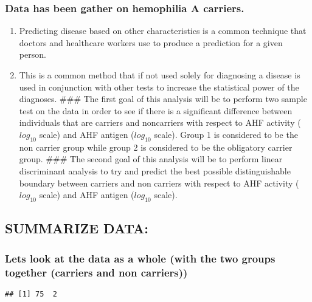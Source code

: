 \documentclass[]{article}
\providecommand{\tightlist}{%
  \setlength{\itemsep}{0pt}\setlength{\parskip}{0pt}}
\begin{document}
\hypertarget{data-has-been-gather-on-hemophilia-a-carriers.}{%
\subsubsection{Data has been gather on hemophilia A
carriers.}\label{data-has-been-gather-on-hemophilia-a-carriers.}}

\begin{enumerate}
\def\labelenumi{\arabic{enumi})}
\tightlist
\item
  Predicting disease based on other characteristics is a common
  technique that doctors and healthcare workers use to produce a
  prediction for a given person.
\item
  This is a common method that if not used solely for diagnosing a
  disease is used in conjunction with other tests to increase the
  statistical power of the diagnoses. \#\#\# The first goal of this
  analysis will be to perform two sample test on the data in order to
  see if there is a significant difference between individuals that are
  carriers and noncarriers with respect to AHF activity (\(log_{10}\)
  scale) and AHF antigen (\(log_{10}\) scale). Group 1 is considered to
  be the non carrier group while group 2 is considered to be the
  obligatory carrier group. \#\#\# The second goal of this analysis will
  be to perform linear discriminant analysis to try and predict the best
  possible distinguishable boundary between carriers and non carriers
  with respect to AHF activity (\(log_{10}\) scale) and AHF antigen
  (\(log_{10}\) scale).
\end{enumerate}

\hypertarget{summarize-data}{%
\subsection{SUMMARIZE DATA:}\label{summarize-data}}

\hypertarget{lets-look-at-the-data-as-a-whole-with-the-two-groups-together-carriers-and-non-carriers}{%
\subsubsection{Lets look at the data as a whole (with the two groups
together (carriers and non
carriers))}\label{lets-look-at-the-data-as-a-whole-with-the-two-groups-together-carriers-and-non-carriers}}

\begin{verbatim}
## [1] 75  2
\end{verbatim}
\end{document}
